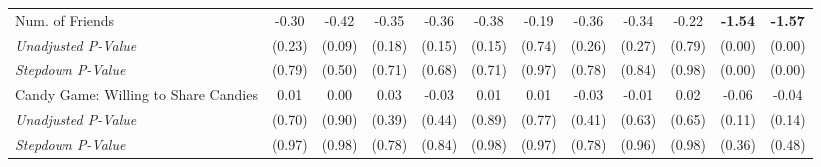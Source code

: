 \begin{tabular}{l c c c c c c c c c c c}
Num. of Friends & -0.30 & -0.42 & -0.35 & -0.36 & -0.38 & -0.19 & -0.36 & -0.34 & -0.22 & \textbf{ -1.54 } & \textbf{ -1.57 } \\
\quad \textit{Unadjusted P-Value} & (0.23) & (0.09) & (0.18) & (0.15) & (0.15) & (0.74) & (0.26) & (0.27) & (0.79) & (0.00) & (0.00) \\
\quad \textit{Stepdown P-Value} & (0.79) & (0.50) & (0.71) & (0.68) & (0.71) & (0.97) & (0.78) & (0.84) & (0.98) & (0.00) & (0.00) \\
Candy Game: Willing to Share Candies & 0.01 & 0.00 & 0.03 & -0.03 & 0.01 & 0.01 & -0.03 & -0.01 & 0.02 & -0.06 & -0.04 \\
\quad \textit{Unadjusted P-Value} & (0.70) & (0.90) & (0.39) & (0.44) & (0.89) & (0.77) & (0.41) & (0.63) & (0.65) & (0.11) & (0.14) \\
\quad \textit{Stepdown P-Value} & (0.97) & (0.98) & (0.78) & (0.84) & (0.98) & (0.97) & (0.78) & (0.96) & (0.98) & (0.36) & (0.48) \\
\bottomrule
\end{tabular}
